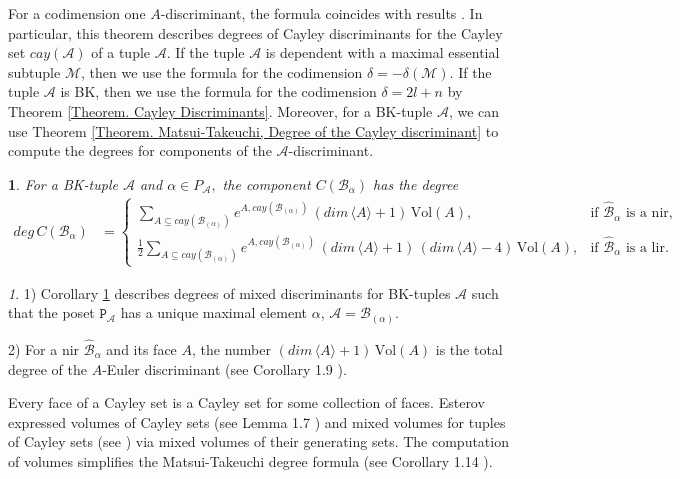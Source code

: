 \documentclass[11pt]{article}
\theoremstyle{plain}
\theoremstyle{definition}
\theoremstyle{remark}
\newtheorem{rem}[thm]{\protect\remarkname}
\theoremstyle{plain}
\theoremstyle{plain}
\theoremstyle{plain}
\newtheorem{cor}[thm]{\protect\corollaryname}
\theoremstyle{definition}
\providecommand{\corollaryname}{Corollary}
\providecommand{\remarkname}{Remark}
\begin{document}
For a codimension one $A$-discriminant, the formula coincides with
results \cite{gelfand_discriminants_1994,dickenstein_tropical_2007}.
In particular, this theorem describes degrees of Cayley discriminants
for the Cayley set $cay(\mathscr{A})$ of a tuple $\mathscr{A}.$
If the tuple $\mathscr{A}$ is dependent with a maximal essential
subtuple $\mathscr{M}$, then we use the formula for the codimension
$\delta=-\delta(\mathscr{M})$. If the tuple $\mathscr{A}$ is BK,
then we use the formula for the codimension $\delta=2l+n$ by Theorem
\ref{Theorem. Cayley Discriminants}. Moreover, for a BK-tuple $\mathscr{A}$,
we can use Theorem \ref{Theorem. Matsui-Takeuchi, Degree of the Cayley discriminant}
to compute the degrees for components of the $\mathscr{A}$-discriminant. 
\begin{cor}
\label{Corollary. Degrees for components of the discriminant for a BK-tuple}For
a BK-tuple $\mathscr{A}$ and $\alpha\in P_{\mathscr{A}},$ the component
$C(\mathscr{B}_{\alpha})$ has the degree 
\begin{align*}
deg\,C(\mathscr{B}_{\alpha}) & =\begin{cases}
\underset{A\subseteq cay(\mathscr{B}_{(\alpha)})}{\sum}e^{A,cay(\mathscr{B}_{(\alpha)})}\,(dim\,\langle A\rangle+1)\,\mathrm{Vol}(A), & \text{if }\hat{\mathscr{B}}_{\alpha}\text{ is a nir,}\\
\frac{1}{2}\underset{A\subseteq cay(\mathscr{B}_{(\alpha)})}{\sum}e^{A,cay(\mathscr{B}_{(\alpha)})}\,(dim\,\langle A\rangle+1)\,(dim\,\langle A\rangle-4)\,\mathrm{Vol}(A), & \text{if }\hat{\mathscr{B}}_{\alpha}\text{ is a lir.}
\end{cases}
\end{align*}
\end{cor}

\begin{rem}
\label{Remark. Degree of the mixed discriminant for a BK-tuple}1)
Corollary \ref{Corollary. Degrees for components of the discriminant for a BK-tuple}
describes degrees of mixed discriminants for BK-tuples $\mathscr{A}$
such that the poset $\mathtt{P}_{\mathscr{A}}$ has a unique maximal
element $\alpha$, $\mathscr{A}=\mathscr{B}_{(\alpha)}$.

2) For a nir $\hat{\mathscr{B}}_{\alpha}$ and its face $A$, the
number $(dim\,\langle A\rangle+1)\,\mathrm{Vol}(A)$ is the total
degree of the $A$-Euler discriminant (see Corollary 1.9 \cite{esterov_discriminant_2013}).
\end{rem}

Every face of a Cayley set is a Cayley set for some collection of
faces. Esterov expressed volumes of Cayley sets (see Lemma 1.7 \cite{esterov_newton_2010})
and mixed volumes for tuples of Cayley sets (see \cite{esterov_multiplicities_2012})
via mixed volumes of their generating sets. The computation of volumes
simplifies the Matsui-Takeuchi degree formula (see Corollary 1.14
\cite{esterov_discriminant_2013}).
\end{document}
